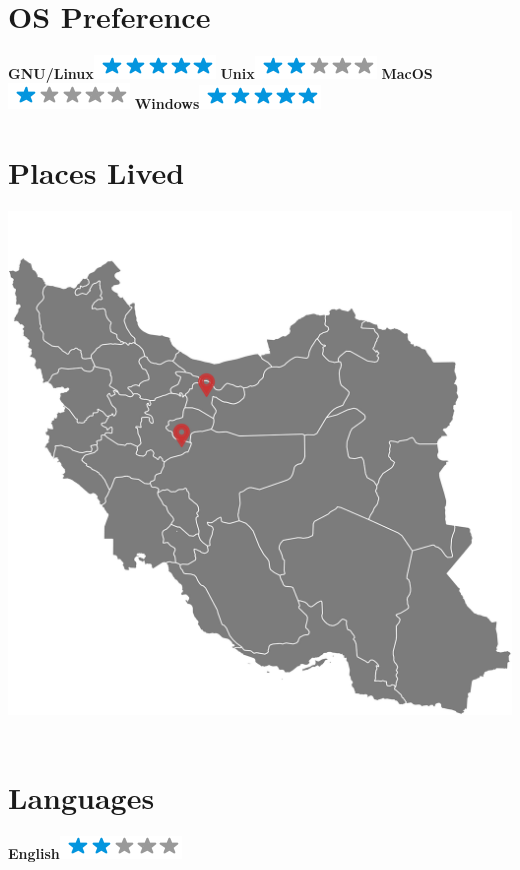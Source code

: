 \documentclass[a4paper]{friggeri-cv}
\begin{document}
\begin{aside}
~
~
~
  \section{OS Preference}
    \textbf{GNU/Linux}\includegraphics[scale=0.40]{img/5stars.png}
    \textbf{Unix}\includegraphics[scale=0.40]{img/2stars.png}
    \textbf{MacOS}\includegraphics[scale=0.40]{img/1stars.png}
    \textbf{Windows}\includegraphics[scale=0.40]{img/5stars.png}
    ~
  \section{Places Lived}
    \includegraphics[scale=0.7]{img/iran.png}
    ~
  \section{Languages}
    \textbf{English}\includegraphics[scale=0.40]{img/2stars.png}
    ~
\end{aside}
\end{document}
